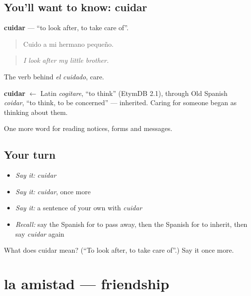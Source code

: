 \subsection*{You'll want to know: cuidar}
\textbf{cuidar} — \textquotedblleft{}to look after, to take care of\textquotedblright{}.

\begin{quote}
Cuido a mi hermano pequeño.
\end{quote}

\begin{quote}
\emph{I look after my little brother.}
\end{quote}

The verb behind \emph{el cuidado}, care.

\begin{cousinweb}
\textbf{cuidar} $\leftarrow$ Latin \emph{cogitare}, \textquotedblleft{}to think\textquotedblright{} (EtymDB 2.1), through Old Spanish \emph{coidar}, \textquotedblleft{}to think, to be concerned\textquotedblright{} — inherited. Caring for someone began as thinking about them.
\end{cousinweb}

\begin{grammarlens}[title={What you've built}]
One more word for reading notices, forms and messages.
\end{grammarlens}

\subsection*{Your turn}
\begin{itemize}
\raggedright
  \item \emph{Say it:} \emph{cuidar}
  \item \emph{Say it:} \emph{cuidar}, once more
  \item \emph{Say it:} a sentence of your own with \emph{cuidar}
  \item \emph{Recall:} say the Spanish for to pass away, then the Spanish for to inherit, then say \emph{cuidar} again
\end{itemize}

\begin{tcolorbox}[breakable,colback=teal!4,colframe=teal!35!black,title={Before you move on}]
What does cuidar mean? (\textquotedblleft{}To look after, to take care of\textquotedblright{}.) Say it once more.
\end{tcolorbox}
\section[la amistad]{la amistad — friendship}

